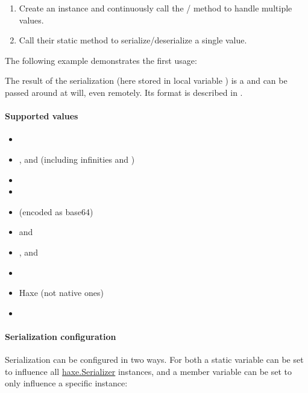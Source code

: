 \begin{enumerate}
	\item Create an instance and continuously call the / method to handle multiple values.
	\item Call their static  method to serialize/deserialize a single value.
\end{enumerate}

The following example demonstrates the first usage:


The result of the serialization (here stored in local variable ) is a  and can be passed around at will, even remotely. Its format is described in .

\paragraph{Supported values}

\begin{itemize}
	\item {}
	\item {},  and  (including infinities and )
	\item {}
	\item {}
	\item {} (encoded as base64)
	\item {} and 
	\item {},  and 
	\item {}
	\item Haxe  (not native ones)
	\item {}
\end{itemize}

\paragraph{Serialization configuration}

Serialization can be configured in two ways. For both a static variable can be set to influence all \href{https://api.haxe.org/haxe/Serializer.html}{haxe.Serializer} instances, and a member variable can be set to only influence a specific instance:

